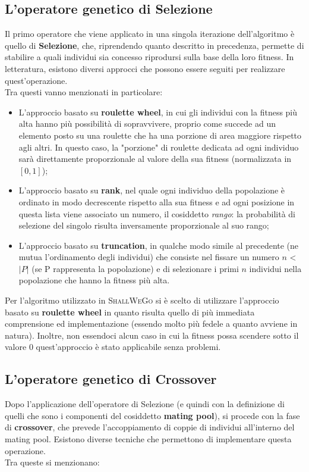     \subsection{L'operatore genetico di Selezione}
        Il primo operatore che viene applicato in una singola iterazione dell'algoritmo è quello di \textbf{Selezione}, che, riprendendo quanto descritto in precedenza, permette di stabilire a quali individui sia concesso riprodursi sulla base della loro fitness. In letteratura, esistono diversi approcci che possono essere seguiti per realizzare quest'operazione. \\
        Tra questi vanno menzionati in particolare:

        \begin{itemize}
            \item L'approccio basato su \textbf{roulette wheel}, in cui gli individui con la fitness più alta hanno più possibilità di sopravvivere, proprio come succede ad un elemento posto su una roulette che ha una porzione di area maggiore rispetto agli altri. In questo caso, la "porzione" di roulette dedicata ad ogni individuo sarà direttamente proporzionale al valore della sua fitness (normalizzata in $[0, 1]$);
            \item L'approccio basato su \textbf{rank}, nel quale ogni individuo della popolazione è ordinato in modo decrescente rispetto alla sua fitness e ad ogni posizione in questa lista viene associato un numero, il cosiddetto \textit{rango}: la probabilità di selezione del singolo risulta inversamente proporzionale al suo rango;
            \item L'approccio basato su \textbf{truncation}, in qualche modo simile al precedente (ne mutua l'ordinamento degli individui) che consiste nel fissare un numero $n$ < $|P|$ (se P rappresenta la popolazione) e di selezionare i primi $n$ individui nella popolazione che hanno la fitness più alta.
        \end{itemize}

        Per l'algoritmo utilizzato in \textsc{ShallWeGo} si è scelto di utilizzare l'approccio basato su \textbf{roulette wheel} in quanto risulta quello di più immediata comprensione ed implementazione (essendo molto più fedele a quanto avviene in natura). Inoltre, non essendoci alcun caso in cui la fitness possa scendere sotto il valore $0$ quest'approccio è stato applicabile senza problemi.

    \subsection{L'operatore genetico di Crossover}
        Dopo l'applicazione dell'operatore di Selezione (e quindi con la definizione di quelli che sono i componenti del cosiddetto \textbf{mating pool}), si procede con la fase di \textbf{crossover}, che prevede l'accoppiamento di coppie di individui all'interno del mating pool. 
        Esistono diverse tecniche che permettono di implementare questa operazione. \\
        Tra queste si menzionano:

